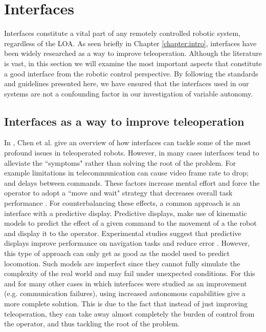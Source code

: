 \documentclass[a4paper,12pt,oneside,openright]{bhamthesis}
\begin{document}
\section{Interfaces}\label{section:interfaces_lit}
Interfaces constitute a vital part of any remotely controlled robotic system, regardless of the LOA. As seen briefly in Chapter \ref{chapter:intro}, interfaces have been widely researched as a way to improve teleoperation. Although the literature is vast, in this section we will examine the most important aspects that constitute a good interface from the robotic control perspective. By following the standards and guidelines presented here, we have ensured that the interfaces used in our systems are not a confounding factor in our investigation of variable autonomy.

\subsection{Interfaces as a way to improve teleoperation}
In \citep{Chen2007}, Chen et al. give an overview of how interfaces can tackle some of the most profound issues in teleoperated robots. However, in many cases interfaces tend to alleviate the ``symptoms" rather than solving the root of the problem. For example limitations in telecommunication can cause video frame rate to drop; and delays between commands. These factors increase mental effort and force the operator to adopt a ``move and wait" strategy \citep{Ferrell1965} that decreases overall task performance \citep{CordeLane2002}. For counterbalancing these effects, a common approach is an interface with a predictive display. Predictive displays, make use of kinematic models to predict the effect of a given command to the movement of a the robot and display it to the operator. Experimental studies suggest that predictive displays improve performance on navigation tasks and reduce error \citep{Ricks2004,Matheson2013}. However, this type of approach can only get as good as the model used to predict locomotion. Such models are imperfect since they cannot fully simulate the complexity of the real world and may fail under unexpected conditions. For this and for many other cases in which interfaces were studied as an improvement (e.g. communication failures), using increased autonomous capabilities give a more complete solution. This is due to the fact that instead of just improving teleoperation, they can take away almost completely the burden of control from the operator, and thus tackling the root of the problem. 
\end{document}
